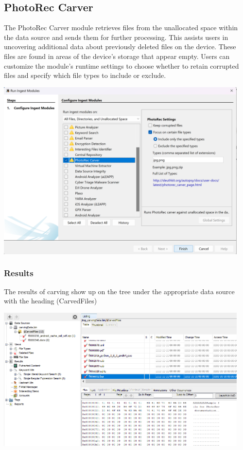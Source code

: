 \documentclass{article}
\begin{document}
\subsection{PhotoRec Carver}
The PhotoRec Carver module retrieves files from the unallocated space within the data source and sends them for further processing. This assists users in uncovering additional data about previously deleted files on the device. These files are found in areas of the device's storage that appear empty. Users can customize the module's runtime settings to choose whether to retain corrupted files and specify which file types to include or exclude.
\begin{center}
    \includegraphics[width=0.95\textwidth]{3/3.11/PhotoRec Carver Settings.png}
\end{center}


\subsubsection*{Results}
The results of carving show up on the tree under the appropriate data source with the heading (CarvedFiles)
\begin{center}
    \includegraphics[width=0.95\textwidth]{3/3.11/PhotoRec Carver Results.png}
\end{center}
\end{document}
